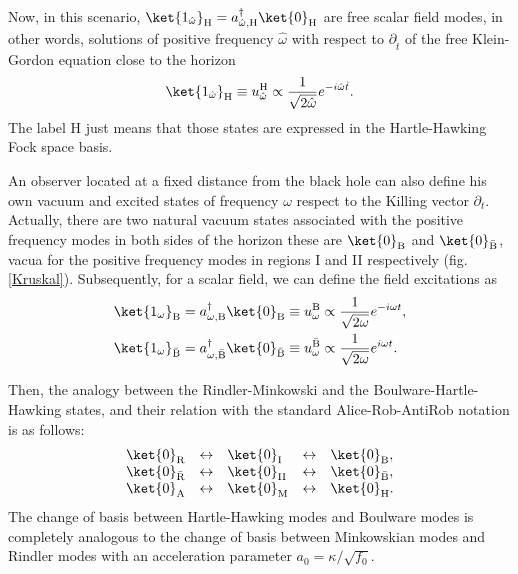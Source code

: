 Now, in this scenario,
$\ket{1_{\hat\omega}}_\text{H}=a^\dagger_{\hat\omega,\text{H}}\ket{0}_\text{H}$
are free scalar field modes, in other words, solutions of positive
frequency ${\hat\omega}$ with respect to $\partial_{\hat t}$  of the
free Klein-Gordon equation close to the horizon
\begin{equation}
\ket{1_{\hat\omega}}_\text{H}\equiv u_{\hat\omega}^\text{H}\propto
\frac{1}{\sqrt{2\hat\omega}}e^{-i\hat\omega \hat t}.
\end{equation}
The label H just means that those states are expressed in the
Hartle-Hawking Fock space basis.

An observer located at a fixed distance from the black hole can also define his own vacuum and
excited states of frequency $\omega$ respect to the Killing vector
$\partial_{t}$. Actually, there are two natural vacuum states associated
with the positive frequency modes in both sides of the horizon these are
$\ket{0}_\text{B}$ and $\ket{0}_{\bar{\text{B}}}$, vacua for the
positive frequency modes in regions I and II respectively (fig.
\ref{Kruskal}). Subsequently, for a scalar field, we can define the field
excitations as
\begin{align}
\ket{1_\omega}_{\text{B}}&=a^\dagger_{\omega,\text{B}}\ket{0}_\text{B}\equiv
u_\omega^{\text{B}}\propto\frac{1}{\sqrt{2\omega}}e^{-i\omega  t},\nonumber\\
\ket{1_\omega}_{\bar{\text{B}}}&=a^\dagger_{\omega,\bar{\text{B}}}
\ket{0}_{\bar{\text{B}}}\equiv u_\omega^{\bar{\text{B}}}\propto\frac{1}{\sqrt{2\omega}}e^{i\omega  t}.
\end{align}


Then, the analogy between the Rindler-Minkowski and the Boulware-Hartle-Hawking states,  and their relation with 
the standard Alice-Rob-AntiRob notation is as follows:
\begin{equation}\label{identif}
\begin{array}{lclcl}
\ket{0}_\text{R}&\leftrightarrow&\ket{0}_\text{I}&\leftrightarrow&\ket{0}_\text{B},\\
\ket{0}_{\bar{\text{R}}}&\leftrightarrow&\ket{0}_{\text{II}}&
\leftrightarrow&\ket{0}_{\bar{\text{B}}},\\
\ket{0}_{\text{A}}&\leftrightarrow&\ket{0}_\text{M}&\leftrightarrow&
\ket{0}_{\text{H}}.
\end{array}
\end{equation}
The change of basis between Hartle-Hawking modes
and Boulware modes is completely analogous to the change of basis
between Minkowskian modes and Rindler modes with an acceleration
parameter $a_0=\kappa/\sqrt{f_0}$.

